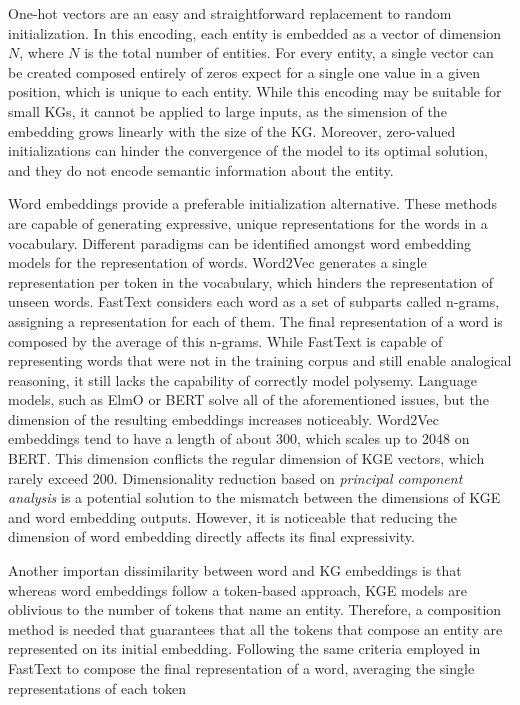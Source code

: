 One-hot vectors are an easy and straightforward replacement to random initialization. In this encoding, each entity is embedded as a vector of dimension $N$, where $N$ is the total number of entities. For every entity, a single vector can be created composed entirely of zeros expect for a single one value in a given position, which is unique to each entity. While this encoding may be suitable for small KGs, it cannot be applied to large inputs, as the simension of the embedding grows linearly with the size of the KG. Moreover, zero-valued initializations can hinder the convergence of the model to its optimal solution, and they do not encode semantic information about the entity.

Word embeddings provide a preferable initialization alternative. These methods are capable of generating expressive, unique representations for the words in a vocabulary. Different paradigms can be identified amongst word embedding models for the representation of words. Word2Vec \citep{word2vec} generates a single representation per token in the vocabulary, which hinders the representation of unseen words. FastText \citep{fasttext1,fasttext2} considers each word as a set of subparts called n-grams, assigning a representation for each of them. The final representation of a word is composed by the average of this n-grams. While FastText is capable of representing words that were not in the training corpus and still enable analogical reasoning, it still lacks the capability of correctly model polysemy. Language models, such as ElmO \citep{elmo} or BERT \citep{bert} solve all of the aforementioned issues, but the dimension of the resulting embeddings increases noticeably. Word2Vec embeddings tend to have a length of about 300, which scales up to 2048 on BERT. This dimension conflicts the regular dimension of KGE vectors, which rarely exceed 200. Dimensionality reduction based on \textit{principal component analysis} \citep{dim_reduction} is a potential solution to the mismatch between the dimensions of KGE and word embedding outputs. However, it is noticeable that reducing the dimension of word embedding directly affects its final expressivity. 

Another importan dissimilarity between word and KG embeddings is that whereas word embeddings follow a token-based approach, KGE models are oblivious to the number of tokens that name an entity. Therefore, a composition method is needed that guarantees that all the tokens that compose an entity are represented on its initial embedding. Following the same criteria employed in FastText to compose the final representation of a word, averaging the single representations of each token 


